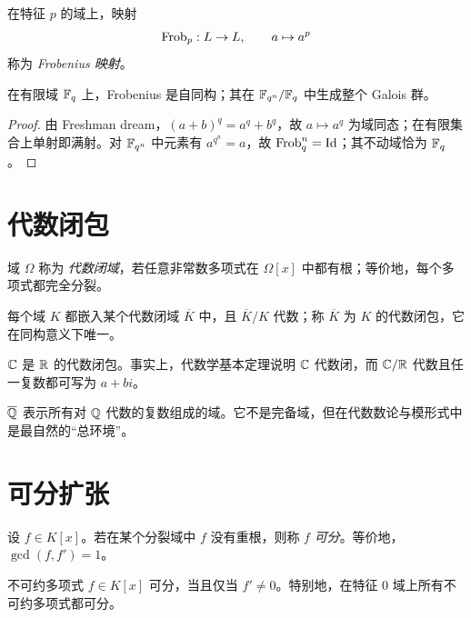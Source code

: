 \begin{definition}
在特征 $p$ 的域上，映射
\[
 \mathrm{Frob}_p:L\to L,\qquad a\mapsto a^p
\]
称为 \emph{Frobenius 映射}。
\end{definition}

\begin{proposition}
在有限域 $\mathbb{F}_q$ 上，Frobenius 是自同构；其在 $\mathbb{F}_{q^n}/\mathbb{F}_q$ 中生成整个 Galois 群。
\end{proposition}

\begin{proof}
由 Freshman dream，$(a+b)^q=a^q+b^q$，故 $a\mapsto a^q$ 为域同态；在有限集合上单射即满射。对 $\mathbb{F}_{q^n}$ 中元素有 $a^{q^n}=a$，故 $\mathrm{Frob}_q^n=\mathrm{Id}$；其不动域恰为 $\mathbb{F}_q$。
\end{proof}

\section{代数闭包}

\begin{definition}
域 $\Omega$ 称为 \emph{代数闭域}，若任意非常数多项式在 $\Omega[x]$ 中都有根；等价地，每个多项式都完全分裂。
\end{definition}

\begin{theorem}[存在性，叙述]
每个域 $K$ 都嵌入某个代数闭域 $\overline K$ 中，且 $\overline K/K$ 代数；称 $\overline K$ 为 $K$ 的代数闭包，它在同构意义下唯一。
\end{theorem}

\begin{example}
$\mathbb{C}$ 是 $\mathbb{R}$ 的代数闭包。事实上，代数学基本定理说明 $\mathbb{C}$ 代数闭，而 $\mathbb{C}/\mathbb{R}$ 代数且任一复数都可写为 $a+bi$。
\end{example}

\begin{remark}
$\overline {\mathbb{Q}}$ 表示所有对 $\mathbb{Q}$ 代数的复数组成的域。它不是完备域，但在代数数论与模形式中是最自然的“总环境”。
\end{remark}

\section{可分扩张}

\begin{definition}
设 $f\in K[x]$。若在某个分裂域中 $f$ 没有重根，则称 $f$ \emph{可分}。等价地，$\gcd(f,f')=1$。
\end{definition}

\begin{proposition}
不可约多项式 $f\in K[x]$ 可分，当且仅当 $f'\ne 0$。特别地，在特征 $0$ 域上所有不可约多项式都可分。
\end{proposition}

